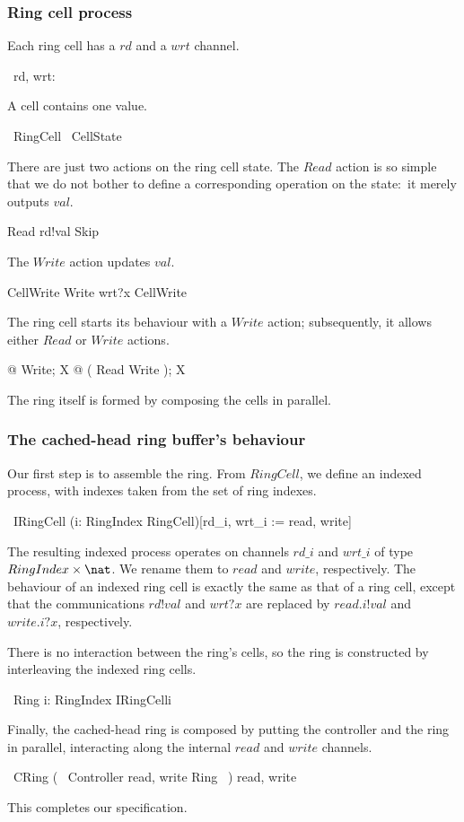 \documentclass{article}
\begin{document}
\subsubsection{Ring cell process}

Each ring cell has a $rd$ and a $wrt$ channel.
\begin{zed}
  \circchannel\ rd, wrt: \nat
\end{zed}
A cell contains one value.
\begin{zed}
  \circprocess\ RingCell  \circbegin\ CellState 
\end{zed}
There are just two actions on the ring cell state.  The $Read$ action
is so simple that we do not bother to define a corresponding operation
on the state:~it merely outputs $val$.
\begin{zed}
  Read  rd!val \then Skip
\end{zed}
The $Write$ action updates $val$.
\begin{zed}
  CellWrite 
  \also %
  Write  wrt?x \then CellWrite
\end{zed}
The ring cell \pagebreak starts its behaviour with a $Write$ action;
subsequently, it allows either $Read$ or $Write$ actions.
\begin{zed}
  @ Write; \mu X @ ( Read \extchoice Write ); X
  \also %
  \circend
\end{zed}
The ring itself is formed by composing the cells in parallel.

\subsubsection{The cached-head ring buffer's behaviour}

Our first step is to assemble the ring.  From $RingCell$, we define an
indexed process, with indexes taken from the set of ring indexes.
\begin{zed}
  \circprocess\ IRingCell  (i: RingIndex \odot RingCell)[rd\_i,
  wrt\_i := read, write]
\end{zed}
The resulting indexed process operates on channels $rd\_i$ and
$wrt\_i$ of type $RingIndex \times \nat$.  We rename them to $read$
and $write$, respectively. The behaviour of an indexed ring cell is
exactly the same as that of a ring cell, except that the
communications $rd!val$ and $wrt?x$ are replaced by $read.i!val$ and
$write.i?x$, respectively.

There is no interaction between the ring's cells, so the ring is
constructed by interleaving the indexed ring cells.
\begin{zed}
  \circprocess\ Ring  \Interleave i: RingIndex \odot
  IRingCell\lfloor i\rfloor
\end{zed}
Finally, the cached-head ring is composed by putting the controller
and the ring in parallel, interacting along the internal $read$ and
$write$ channels.
\begin{zed}
  \circprocess\ CRing  (~ Controller \lpar \lchanset read, write
  \rchanset \rpar Ring ~) \hide \lchanset read, write \rchanset
\end{zed}
This completes our specification.
\end{document}
